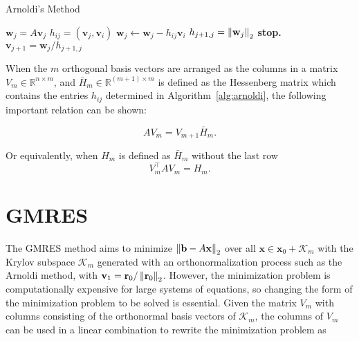 \begin{algorithm}
	\caption{Arnoldi's Method}\label{alg:arnoldi}
	\begin{algorithmic}[1]
                \State $\mathbf{w}_j = A \mathbf{v}_j$
                    \State $h_{ij} = \left(\mathbf{v}_j, \mathbf{v}_i\right)$
                    \State $\mathbf{w}_j \gets \mathbf{w}_j - h_{ij}\mathbf{v}_i$
                \EndFor
                \State $h_{j+1, j} = \left\lVert\mathbf{w}_j\right\rVert_2$
                    \State \textbf{stop.}
                \EndIf
                \State $\mathbf{v}_{j+1} = \mathbf{w}_j/h_{j+1, j}$
            \EndFor
		\EndProcedure
	\end{algorithmic}
\end{algorithm}

When the $m$ orthogonal basis vectors are arranged as the columns in a matrix $V_m \in \mathbb{R}^{n \times m}$, and $\bar{H}_m \in \mathbb{R}^{(m+1) \times m}$ is defined as the Hessenberg matrix which contains the entries $h_{ij}$ determined in Algorithm~\ref{alg:arnoldi}, the following important relation can be shown:

\begin{equation}
    \label{eq:arnoldi_relation}
    A V_m = V_{m+1}\bar{H}_m.
\end{equation}

Or equivalently, when $H_m$ is defined as $\bar{H}_m$ without the last row
\begin{equation}
    \label{eq:arnoldi_relation2}
    V^\top_m A V_m = H_m.
\end{equation}

\section{GMRES}
The GMRES method aims to minimize $\left\lVert\mathbf{b} - A\mathbf{x}\right\rVert_2$ over all $\mathbf{x} \in \mathbf{x}_0 + \mathcal{K}_m $ with the Krylov subspace $\mathcal{K}_m$ generated with an orthonormalization process such as the Arnoldi method, with $\mathbf{v}_1 = \mathbf{r}_0/\left\lVert\mathbf{r}_0\right\rVert_2$. However, the minimization problem is computationally expensive for large systems of equations, so changing the form of the minimization problem to be solved is essential. Given the matrix $V_m$ with columns consisting of the orthonormal basis vectors of $\mathcal{K}_m$, the columns of $V_m$ can be used in a linear combination to rewrite the minimization problem as

